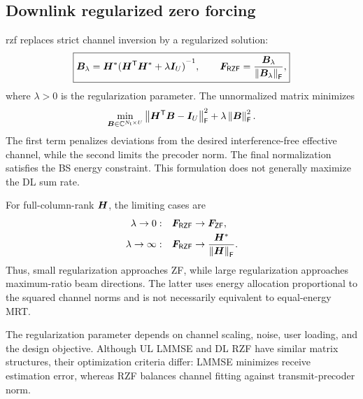 \subsection{Downlink regularized zero forcing}
\Ac{rzf} replaces strict channel inversion by a regularized solution:
\begin{equation}
	\boxed{
		\bm{B}_\lambda
		=\bm{H}^*{({\bm{H}}^{\mathsf{T}}\bm{H}^*+\lambda\bm{I}_U)}^{-1},
		\qquad
		\bm{F}_{\mathsf{RZF}}
		=\frac{\bm{B}_\lambda}{\left\|\bm{B}_\lambda\right\|_{\mathsf{F}}},
	}
	\label{eq:rzf}
\end{equation}
where $\lambda>0$ is the regularization parameter. The unnormalized matrix minimizes
\begin{equation}
	\min_{\bm{B}\in\mathbb{C}^{N_{\mathsf{t}}\times U}}
	\left\|{\bm{H}}^{\mathsf{T}}\bm{B}-\bm{I}_U\right\|_{\mathsf{F}}^2
	+\lambda\left\|\bm{B}\right\|_{\mathsf{F}}^2.
	\label{eq:rzfobj}
\end{equation}
The first term penalizes deviations from the desired interference-free effective channel, while the second limits the precoder norm. The final normalization satisfies the BS energy constraint. This formulation does not generally maximize the DL sum rate.

For full-column-rank $\bm{H}$, the limiting cases are
\begin{align*}
	\lambda\to0:\quad&
	\bm{F}_{\mathsf{RZF}}\to\bm{F}_{\mathsf{ZF}},\\
	\lambda\to\infty:\quad&
	\bm{F}_{\mathsf{RZF}}\to
	\frac{\bm{H}^*}{\left\|\bm{H}\right\|_{\mathsf{F}}}.
\end{align*}
Thus, small regularization approaches ZF, while large regularization approaches maximum-ratio beam directions. The latter uses energy allocation proportional to the squared channel norms and is not necessarily equivalent to equal-energy MRT.

The regularization parameter depends on channel scaling, noise, user loading, and the design objective. Although UL LMMSE and DL RZF have similar matrix structures, their optimization criteria differ: LMMSE minimizes receive estimation error, whereas RZF balances channel fitting against transmit-precoder norm.

